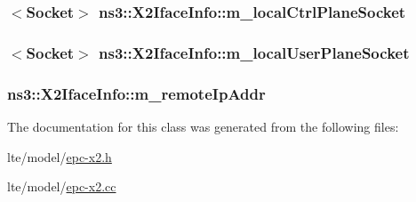 \subsubsection[{\texorpdfstring{m\+\_\+local\+Ctrl\+Plane\+Socket}{m_localCtrlPlaneSocket}}]{$<${\bf Socket}$>$ ns3\+::\+X2\+Iface\+Info\+::m\+\_\+local\+Ctrl\+Plane\+Socket}\hypertarget{classns3_1_1X2IfaceInfo_a2ae45b9d509ee8f3d3ba049eacf89b8c}{}\label{classns3_1_1X2IfaceInfo_a2ae45b9d509ee8f3d3ba049eacf89b8c}
\subsubsection[{\texorpdfstring{m\+\_\+local\+User\+Plane\+Socket}{m_localUserPlaneSocket}}]{$<${\bf Socket}$>$ ns3\+::\+X2\+Iface\+Info\+::m\+\_\+local\+User\+Plane\+Socket}\hypertarget{classns3_1_1X2IfaceInfo_aed8c37f6d0ee6907fe0a755b72f47f7e}{}\label{classns3_1_1X2IfaceInfo_aed8c37f6d0ee6907fe0a755b72f47f7e}
\subsubsection[{\texorpdfstring{m\+\_\+remote\+Ip\+Addr}{m_remoteIpAddr}}]{ ns3\+::\+X2\+Iface\+Info\+::m\+\_\+remote\+Ip\+Addr}\hypertarget{classns3_1_1X2IfaceInfo_a3b170ed7c2db07acb2a66ced1ea84453}{}\label{classns3_1_1X2IfaceInfo_a3b170ed7c2db07acb2a66ced1ea84453}


The documentation for this class was generated from the following files\+:\begin{DoxyCompactItemize}
\item 
lte/model/\hyperlink{epc-x2_8h}{epc-\/x2.\+h}\item 
lte/model/\hyperlink{epc-x2_8cc}{epc-\/x2.\+cc}\end{DoxyCompactItemize}
